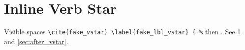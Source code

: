 \documentclass{article}
\begin{document}
\section{Inline Verb Star}\label{sec:verb_star}
Visible spaces \verb*|\cite{fake_vstar} \label{fake_lbl_vstar} { %| then \cite{k1} \label{sec:after_vstar}.
See \ref{sec:verb_star} and \ref{sec:after_vstar}.


\end{document}
